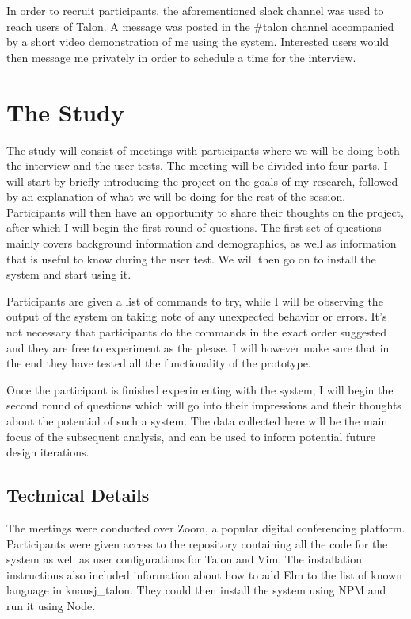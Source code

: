 \documentclass[../thesis.tex]{subfiles}
\begin{document}
In order to recruit participants, the aforementioned slack channel was used to reach users of Talon.
A message was posted in the \#talon channel accompanied by a short video demonstration of me using the system.
Interested users would then message me privately in order to schedule a time for the interview.

\section{The Study}
The study will consist of meetings with participants where we will be doing both the interview and the user tests.
The meeting will be divided into four parts.
I will start by briefly introducing the project on the goals of my research, followed by an explanation of what we will be doing for
the rest of the session.
Participants will then have an opportunity to share their thoughts on the project, after which I will begin the first round of questions.
The first set of questions mainly covers background information and demographics, as well as information that is useful to know
during the user test.
We will then go on to install the system and start using it.

Participants are given a list of commands to try, while I will be observing
the output of the system on taking note of any unexpected behavior or errors.
It's not necessary that participants do the commands in the exact order suggested and they are free to experiment as the please.
I will however make sure that in the end they have tested all the functionality of the prototype.

Once the participant is finished experimenting with the system, I will begin the second round of questions
which will go into their impressions and their thoughts about the potential of such a system.
The data collected here will be the main focus of the subsequent analysis, and can be used to
inform potential future design iterations.

\subsection{Technical Details}
The meetings were conducted over Zoom, a popular digital conferencing platform.
Participants were given access to the repository containing all the code for the system
as well as user configurations for Talon and Vim.
The installation instructions also included information about how to add Elm to the list of known language in knausj\_talon.
They could then install the system using NPM and run it using Node.
\end{document}
